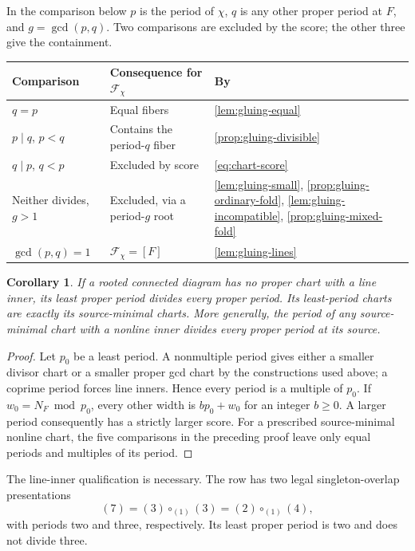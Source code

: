 \documentclass[11pt,a4paper]{amsart}
\numberwithin{equation}{section}
\theoremstyle{plain}
\newtheorem{corollary}[theorem]{Corollary}
\theoremstyle{definition}
\begin{document}
\begin{table}[t]
\parbox{\textwidth}{In the comparison below \(p\) is the period of \(\chi\), \(q\) is any other proper period at \(F\), and \(g=\gcd(p,q)\).  Two comparisons are excluded by the score; the other three give the containment.}

\medskip
\begin{tabular}{l|l|l}
Comparison & Consequence for \(\mathcal F_\chi\) & By\\ \hline
\(q=p\) & Equal fibers & \ref{lem:gluing-equal}\\
\(p\mid q\), \(p<q\) & Contains the period-\(q\) fiber & \ref{prop:gluing-divisible}\\
\(q\mid p\), \(q<p\) & Excluded by score & \eqref{eq:chart-score}\\
Neither divides, \(g>1\) & Excluded, via a period-\(g\) root & \ref{lem:gluing-small}, \ref{prop:gluing-ordinary-fold}, \ref{lem:gluing-incompatible}, \ref{prop:gluing-mixed-fold}\\
\(\gcd(p,q)=1\) & \(\mathcal F_\chi=[F]\) & \ref{lem:gluing-lines}
\end{tabular}
\end{table}

\begin{corollary}\label{cor:least-root-period}
If a rooted connected diagram has no proper chart with a line inner, its least proper period divides every proper period.  Its least-period charts are exactly its source-minimal charts.  More generally, the period of any source-minimal chart with a nonline inner divides every proper period at its source.
\end{corollary}
\begin{proof}
Let \(p_0\) be a least period.  A nonmultiple period gives either a smaller divisor chart or a smaller proper gcd chart by the constructions used above; a coprime period forces line inners.  Hence every period is a multiple of \(p_0\).  If \(w_0=N_F\bmod p_0\), every other width is \(bp_0+w_0\) for an integer \(b\ge0\).  A larger period consequently has a strictly larger score.  For a prescribed source-minimal nonline chart, the five comparisons in the preceding proof leave only equal periods and multiples of its period.
\end{proof}

The line-inner qualification is necessary.  The row has two legal singleton-overlap presentations
\[
 (7)=(3)\circ_{(1)}(3)=(2)\circ_{(1)}(4),
\]
with periods two and three, respectively.  Its least proper period is two and does not divide three.
\end{document}
